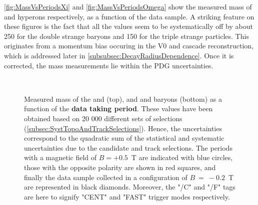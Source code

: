 \Figs\ref{fig:MassVsPeriodsXi} and \ref{fig:MassVsPeriodsOmega} show the measured mass of \rmXi and \rmOmega hyperons respectively, as a function of the data sample. A striking feature on these figures is the fact that all the values seem to be systematically off by about 250 \kmass for the double strange baryons and 150 \kmass for the triple strange particles. This originates from a momentum bias occuring in the V0 and cascade reconstruction, which is addressed later in \Sec\ref{subsubsec:DecayRadiusDependence}. Once it is corrected, the mass measurements lie within the PDG uncertainties.

\begin{landscape}
\begin{figure}[p]
\centering
 \\
\caption{Measured mass of the \rmXiM and \rmAxiP (top), and \rmOmegaM and \rmAomegaP baryons (bottom) as a function of the \textbf{data taking period}. These values have been obtained based on 20 000 different sets of selections (\Sec\ref{subsec:SystTopoAndTrackSelections}). Hence, the uncertainties correspond to the quadratic sum of the statistical and systematic uncertainties due to the candidate and track selections. The periods with a magnetic field of $B = +0.5$~T are indicated with blue circles, those with the opposite polarity are shown in red squares, and finally the data sample collected in a configuration of $B~=~-0.2$~T are represented in black diamonds. Moreover, the "/C" and "/F" tags are here to signify "CENT" and "FAST" trigger modes respectively.}
	\label{fig:MassVsPeriods}
\end{figure}
\end{landscape}

